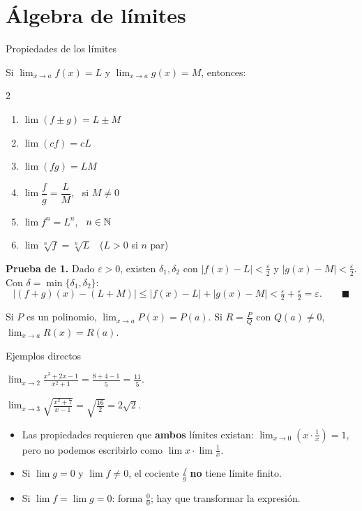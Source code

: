 \documentclass[10pt,aspectratio=169]{beamer}
\begin{document}
\section{Álgebra de límites}

\begin{frame}{Propiedades de los límites}
  \begin{teorema}
    Si $\lim_{x\to a}f(x)=L$ y $\lim_{x\to a}g(x)=M$, entonces:
    \begin{multicols}{2}
    \begin{enumerate}
      \item $\lim(f\pm g)=L\pm M$
      \item $\lim(cf)=cL$
      \item $\lim(fg)=LM$
      \item $\lim\dfrac fg=\dfrac LM$, \ si $M\neq0$
      \item $\lim f^n=L^n$, \ $n\in\mathbb{N}$
      \item $\lim\sqrt[n]{f}=\sqrt[n]{L}$ \ ($L>0$ si $n$ par)
    \end{enumerate}
    \end{multicols}
  \end{teorema}
  \textbf{Prueba de 1.} Dado $\varepsilon>0$, existen $\delta_1,\delta_2$ con $|f(x)-L|<\frac\varepsilon2$ y $|g(x)-M|<\frac\varepsilon2$.
  Con $\delta=\min\{\delta_1,\delta_2\}$:
  \[ |(f+g)(x)-(L+M)|\le|f(x)-L|+|g(x)-M|<\tfrac\varepsilon2+\tfrac\varepsilon2=\varepsilon.\qquad\blacksquare \]
  \begin{proposicion}[consecuencia]
    Si $P$ es un polinomio, $\lim_{x\to a}P(x)=P(a)$. Si $R=\frac PQ$ con $Q(a)\neq0$, $\lim_{x\to a}R(x)=R(a)$.
  \end{proposicion}
\end{frame}

\begin{frame}{Ejemplos directos}
  \begin{ejemplo}[1]
    $\displaystyle\lim_{x\to2}\frac{x^3+2x-1}{x^2+1}=\frac{8+4-1}{5}=\frac{11}{5}$.
  \end{ejemplo}
  \begin{ejemplo}[2]
    $\displaystyle\lim_{x\to3}\sqrt{\frac{x^2+7}{x-1}}=\sqrt{\frac{16}{2}}=2\sqrt2$.
  \end{ejemplo}
  \begin{observacion}[¡cuidado!]
    \begin{itemize}
      \item Las propiedades requieren que \textbf{ambos} límites existan: $\lim_{x\to0}\left(x\cdot\frac1x\right)=1$, pero no podemos
        escribirlo como $\lim x\cdot\lim\frac1x$.
      \item Si $\lim g=0$ y $\lim f\ne0$, el cociente $\frac fg$ \textbf{no} tiene límite finito.
      \item Si $\lim f=\lim g=0$: forma  $\frac00$; hay que transformar la expresión.
    \end{itemize}
  \end{observacion}
\end{frame}
\end{document}
